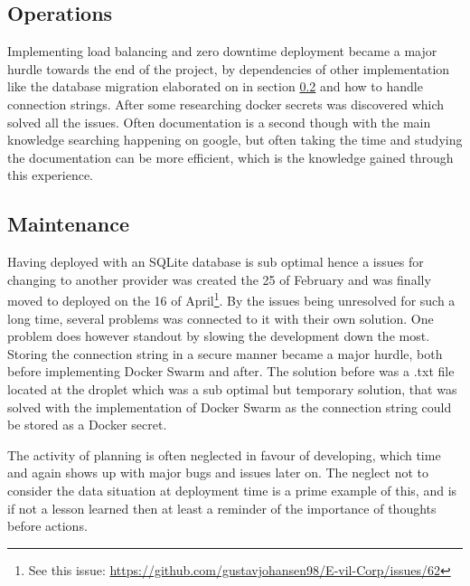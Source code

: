 \documentclass[report/main.tex]{subfiles}
\begin{document}
            
        \subsection{Operations}
        \label{subsec:operations}
            
            
            Implementing load balancing and zero downtime deployment became a major hurdle towards the end of the project, by dependencies of other implementation like the database migration elaborated on in section \ref{subsec:maintenance} and how to handle connection strings. After some researching docker secrets was discovered which solved all the issues. Often documentation is a second though with the main knowledge searching happening on google, but often taking the time and studying the documentation can be more efficient, which is the knowledge gained through this experience.
            
        \subsection{Maintenance}
        \label{subsec:maintenance}
            
            Having deployed with an SQLite database is sub optimal hence a issues for changing to another provider was created the 25 of February and was finally moved to deployed on the 16 of April\footnote{See this issue: \hyperlink{https://github.com/gustavjohansen98/E-vil-Corp/issues/62}{https://github.com/gustavjohansen98/E-vil-Corp/issues/62}}. By the issues being unresolved for such a long time, several problems was connected to it with their own solution. One problem does however standout by slowing the development down the most. Storing the connection string in a secure manner became a major hurdle, both before implementing Docker Swarm and after. The solution before was a .txt file located at the droplet which was a sub optimal but temporary solution, that was solved with the implementation of Docker Swarm as the connection string could be stored as a Docker secret.
            
            The activity of planning is often neglected in favour of developing, which time and again shows up with major bugs and issues later on. The neglect not to consider the data situation at deployment time is a prime example of this, and is if not a lesson learned then at least a reminder of the importance of thoughts before actions.
        
\end{document}
